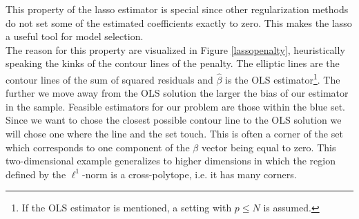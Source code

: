 \documentclass{article}
\theoremstyle{definition}
\begin{document}
This property of the lasso estimator is special since other regularization methods do not set some of the estimated coefficients exactly to zero. This makes the lasso a useful tool for model selection. \\
The reason for this property are visualized in Figure \ref{lassopenalty}, heuristically speaking the kinks of the contour lines of the penalty.
The elliptic lines are the contour lines of the sum of squared residuals and  $\hat{\beta}$ is the OLS estimator\footnote{If the OLS estimator is mentioned, a setting with $p\leq N$ is assumed.}. 
The further we move away from the OLS solution the larger the bias of our estimator in the sample.
Feasible estimators for our problem are those within the blue set.
Since we want to chose the closest possible contour line to the OLS solution we will chose one where the line and the set touch.
This is often a corner of the set which corresponds to one component of the $\beta$ vector being equal to zero. This two-dimensional example generalizes to higher dimensions in which the region defined by the $\ell^1$-norm is a cross-polytope, i.e. it has many corners. \newline


\end{document}
